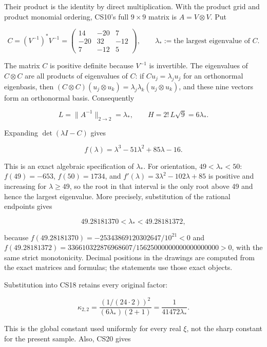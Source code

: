 \documentclass[
  11pt,
]{article}
\begin{document}
Their product is the identity by direct multiplication. With the product
grid and product monomial ordering, CS10's full \(9\times9\) matrix is
\(A=V\otimes V\). Put

\[
 C=(V^{-1})^*V^{-1}
  =\begin{pmatrix}14&-20&7\\-20&32&-12\\7&-12&5\end{pmatrix},
 \qquad \lambda_*:=\text{the largest eigenvalue of }C.         \tag{CE7}
\]

The matrix \(C\) is positive definite because \(V^{-1}\) is invertible.
The eigenvalues of \(C\otimes C\) are all products of eigenvalues of
\(C\): if \(Cu_j=\lambda_j u_j\) for an orthonormal eigenbasis, then
\((C\otimes C)(u_j\otimes u_k)=\lambda_j\lambda_k(u_j\otimes u_k)\), and
these nine vectors form an orthonormal basis. Consequently

\[
 L=\|A^{-1}\|_{2\to2}=\lambda_*,\qquad
 H=2!\,L\sqrt9=6\lambda_*.                                  \tag{CE8}
\]

Expanding \(\det(\lambda I-C)\) gives

\[
 f(\lambda)=\lambda^3-51\lambda^2+85\lambda-16.                \tag{CE9}
\]

This is an exact algebraic specification of \(\lambda_*\). For
orientation, \(49<\lambda_*<50\): \(f(49)=-653\), \(f(50)=1734\), and
\(f'(\lambda)=3\lambda^2-102\lambda+85\) is positive and increasing for
\(\lambda\geq49\), so the root in that interval is the only root above
49 and hence the largest eigenvalue. More precisely, substitution of the
rational endpoints gives

\[
 49.28181370<\lambda_*<49.28181372,
\]

because \(f(49.28181370)=-25343869120302647/10^{21}<0\) and\linebreak[4]
\(f(49.28181372)=336610322876968607/15625000000000000000000>0\), with
the same strict monotonicity. Decimal positions in the drawings are
computed from the exact matrices and formulas; the statements use those
exact objects.

Substitution into CS18 retains every original factor:

\[
 \kappa_{2,2}
 =\frac{(1/(24\cdot2))^2}{(6\lambda_*)(2+1)}
 =\frac1{41472\lambda_*}.                                   \tag{CE10}
\]

This is the global constant used uniformly for every real \(\xi\), not
the sharp constant for the present sample. Also, CS20 gives
\end{document}

